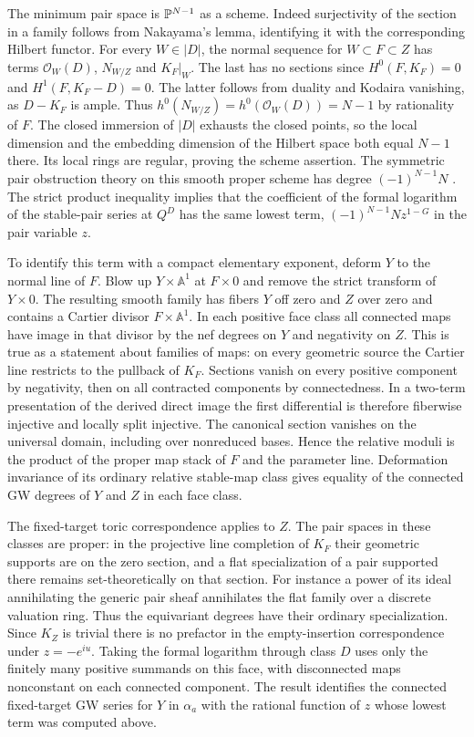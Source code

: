 The minimum pair space is $\mathbb P^{N-1}$ as a scheme. Indeed
surjectivity of the section in a family follows from Nakayama's
lemma, identifying it with the corresponding Hilbert functor.
For every $W\in|D|$, the normal sequence for $W\subset F\subset Z$
has terms $\mathcal O_W(D)$, $N_{W/Z}$ and $K_F|_W$. The last has
no sections since $H^0(F,K_F)=0$ and $H^1(F,K_F-D)=0$. The latter
follows from duality and Kodaira vanishing, as $D-K_F$ is ample.
Thus $h^0(N_{W/Z})=h^0(\mathcal O_W(D))=N-1$ by rationality of
$F$. The closed immersion of $|D|$ exhausts the closed points, so the
local dimension and the embedding dimension of the Hilbert space
both equal $N-1$ there. Its local rings are regular, proving the
scheme assertion. The symmetric pair obstruction theory on this smooth
proper scheme has degree $(-1)^{N-1}N$ \cite{PT}. The strict product
inequality implies that the coefficient of the formal logarithm of
the stable-pair series at $Q^D$ has the same lowest term,
$(-1)^{N-1}N z^{1-G}$ in the pair variable $z$.

To identify this term with a compact elementary exponent, deform $Y$
to the normal line of $F$. Blow up $Y\times\mathbb A^1$ at
$F\times0$ and remove the strict transform of $Y\times0$. The resulting
smooth family has fibers $Y$ off zero and $Z$ over zero and contains
a Cartier divisor $F\times\mathbb A^1$. In each positive face class
all connected maps have image in that divisor by the nef degrees on
$Y$ and negativity on $Z$. This is true as a statement about families
of maps: on every geometric source the Cartier line restricts to the
pullback of $K_F$. Sections vanish on every positive component by
negativity, then on all contracted components by connectedness. In a
two-term presentation of the derived direct image the first differential
is therefore fiberwise injective and locally split injective. The
canonical section vanishes on the universal domain, including over
nonreduced bases. Hence the relative moduli is the product of the
proper map stack of $F$ and the parameter line. Deformation invariance
of its ordinary relative stable-map class gives equality of the
connected GW degrees of $Y$ and $Z$ in each face class.

The fixed-target toric correspondence \cite[Theorem~1]{PP} applies
to $Z$. The pair spaces in these classes are proper: in the projective
line completion of $K_F$ their geometric supports are on the zero
section, and a flat specialization of a pair supported there remains
set-theoretically on that section. For instance a power of its ideal
annihilating the generic pair sheaf annihilates the flat family over
a discrete valuation ring. Thus the equivariant degrees have their
ordinary specialization. Since $K_Z$ is trivial there is no prefactor
in the empty-insertion correspondence under $z=-e^{iu}$. Taking the
formal logarithm through class $D$ uses only the finitely many
positive summands on this face, with disconnected maps nonconstant on
each connected component. The result identifies the connected fixed-target
GW series for $Y$ in $\alpha_a$ with the rational function of $z$
whose lowest term was computed above.

